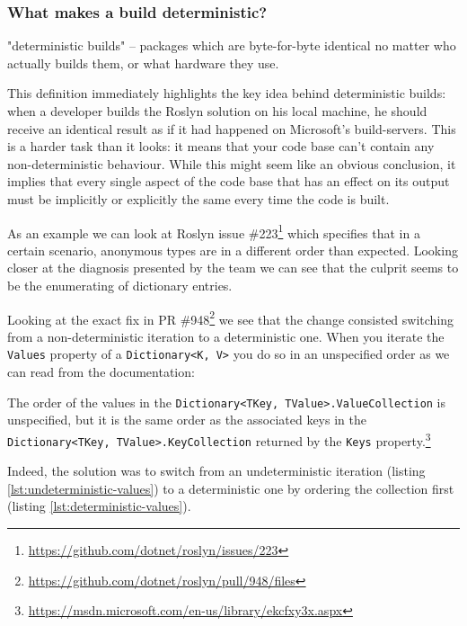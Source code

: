 \subsubsection{What makes a build deterministic?}
\label{sec:deterministic-builds-what}

\begin{displayquote}
"deterministic builds" -- packages which are byte-for-byte identical no matter who actually builds them, or what hardware they use.\parencite{Perry2013} 
\end{displayquote}

\noindent This definition immediately highlights the key idea behind deterministic builds: when a developer builds the Roslyn solution on his local machine, he should receive an identical result as if it had happened on Microsoft's build-servers. This is a harder task than it looks: it means that your code base can't contain any non-deterministic behaviour. While this might seem like an obvious conclusion, it implies that every single aspect of the code base that has an effect on its output must be implicitly or explicitly the same every time the code is built. 

As an example we can look at Roslyn issue \#223\footnote{\url{https://github.com/dotnet/roslyn/issues/223}} which specifies that in a certain scenario, anonymous types are  in a different order than expected. Looking closer at the diagnosis presented by the team we can see that the culprit seems to be the enumerating of dictionary entries.

Looking at the exact fix in PR \#948\footnote{\url{https://github.com/dotnet/roslyn/pull/948/files}} we see that the change consisted switching from a non-deterministic iteration to a deterministic one. When you iterate the \texttt{Values} property of a \texttt{Dictionary<K, V>} you do so in an unspecified order as we can read from the documentation:

\begin{displayquote}
The order of the values in the \texttt{Dictionary<TKey, TValue>.ValueCollection} is unspecified, but it is the same order as the associated keys in the \texttt{Dictionary<TKey, TValue>.KeyCollection} returned by the \texttt{Keys} property.\footnote{\url{https://msdn.microsoft.com/en-us/library/ekcfxy3x.aspx}}
\end{displayquote}

\noindent Indeed, the solution was to switch from an undeterministic iteration (listing \ref{lst:undeterministic-values}) to a deterministic one by ordering the collection first (listing \ref{lst:deterministic-values}).


